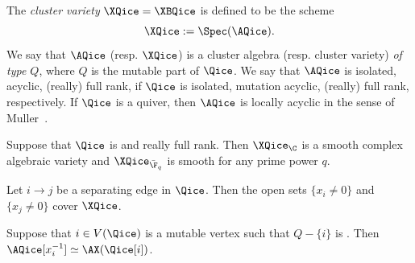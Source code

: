 The \emph{cluster variety} $\XQice=\XBQice$ is defined to be the scheme
\begin{equation*}%
\XQice:=\Spec(\AQice).
\end{equation*}
We say that $\AQice$ (resp. $\XQice$) is a cluster algebra (resp. cluster variety) \emph{of type $Q$}, where $Q$ is the mutable part of $\Qice$.  We say that $\AQice$ is isolated, acyclic, (really) full rank, if $\Qice$ is isolated, mutation acyclic, (really) full rank, respectively.  If $\Qice$ is a \Louise quiver, then $\AQice$ is locally acyclic in the sense of Muller~\cite{Muller}.


\begin{proposition}\label{prop:Mulsmooth}
Suppose that $\Qice$ is \Louise and really full rank.  Then $\XQice_\C$ is a smooth complex algebraic variety and $\XQice_{\bar \F_q}$ is smooth for any prime power $q$.
\end{proposition}

\begin{proposition}\label{prop:Mulcover}
Let $i \to j$ be a separating edge in $\Qice$.  Then the open sets $\{x_i \neq 0\}$ and $\{x_j \neq 0\}$ cover $\XQice$.
\end{proposition}

\begin{proposition}\label{prop:Mulloc}
Suppose that $i \in V(\Qice)$ is a mutable vertex such that $Q- \{i\}$ is \Louise.  Then $\AQice[x_i^{-1}] \simeq \AX(\Qice[i])$.
\end{proposition}

